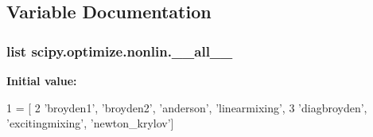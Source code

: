 \subsection{Variable Documentation}
\hypertarget{namespacescipy_1_1optimize_1_1nonlin_a980d070a644fbf263ba8d74362a4c3c1}{}
\subsubsection[{\+\_\+\+\_\+all\+\_\+\+\_\+}]{\setlength{\rightskip}{0pt plus 5cm}list scipy.\+optimize.\+nonlin.\+\_\+\+\_\+all\+\_\+\+\_\+}\label{namespacescipy_1_1optimize_1_1nonlin_a980d070a644fbf263ba8d74362a4c3c1}
{\bfseries Initial value\+:}
\begin{DoxyCode}
1 = [
2     \textcolor{stringliteral}{'broyden1'}, \textcolor{stringliteral}{'broyden2'}, \textcolor{stringliteral}{'anderson'}, \textcolor{stringliteral}{'linearmixing'},
3     \textcolor{stringliteral}{'diagbroyden'}, \textcolor{stringliteral}{'excitingmixing'}, \textcolor{stringliteral}{'newton\_krylov'}]
\end{DoxyCode}
\hypertarget{namespacescipy_1_1optimize_1_1nonlin_a28b5c05f917e98b2c130627e965c9ae3}{}
